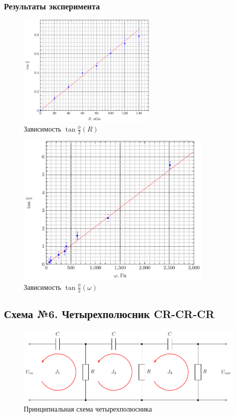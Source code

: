 \subsubsection{Результаты эксперимента}

\begin{figure}[H]
	\centering
	\includegraphics[width=0.6\textwidth]{img/chem5_phi_R}
	\caption{Зависимость $\tan\frac\phi2(R)$}
	\label{fig:phaserot_phi_R}
\end{figure}

\begin{figure}[H]
	\centering
	\includegraphics[width=0.85\textwidth]{img/chem5_phi_omega}
	\caption{Зависимость $\tan\frac\phi2(\omega)$}
	\label{fig:phaserot_phi_omega}
\end{figure}

\subsection{Схема №6. Четырехполюсник CR-CR-CR}

\begin{figure}[H]
	\centering
	\includegraphics[]{chems/chem6}
	\caption{Принципиальная схема четырехполюсника}
	\label{fig:ph_rot2}
\end{figure}

